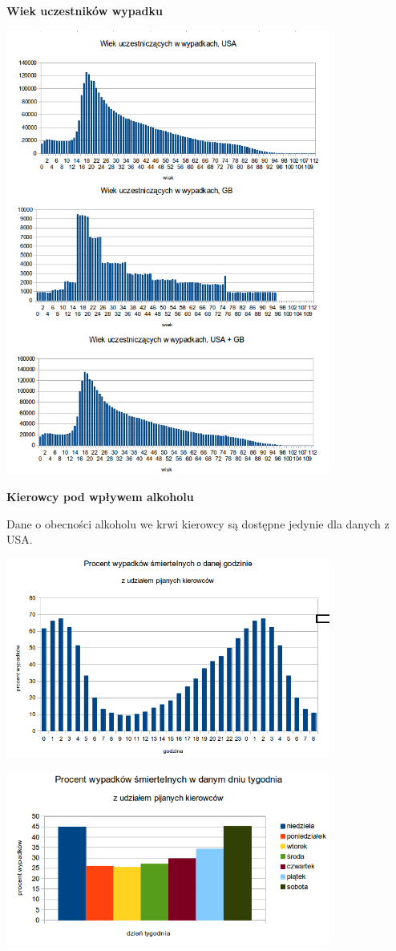 \textbf{Wiek uczestników wypadku}

\includegraphics[width=0.8\textwidth]{images/statistics/person_age.png}

\textbf{Kierowcy pod wpływem alkoholu}

Dane o obecności alkoholu we krwi kierowcy są dostępne jedynie dla
danych z USA.

\includegraphics[width=0.8\textwidth]{images/hipotheses/drunk_drivers/hour.png}

\includegraphics[width=0.8\textwidth]{images/hipotheses/drunk_drivers/day_of_week.png}

